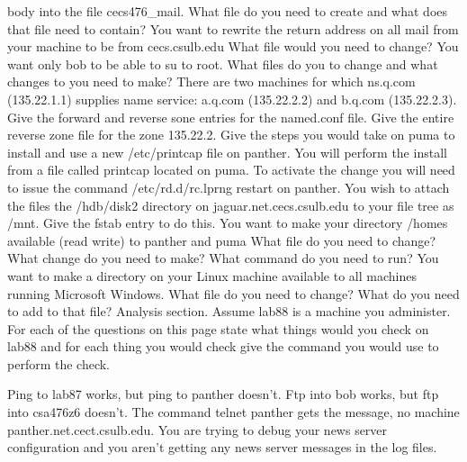 body into the file {\ltt{}cecs476_mail}.
What file do you need to create and what does that file need to contain?
\vskip 1.6in
\vfill\eject
\ques
You want to rewrite the return address on all mail from your machine
to be from {\ltt{}cecs.csulb.edu}
What file would you need to change?
\vskip 0.5in
\ques
You want only {\ltt{}bob} to be able to {\ltt{}su} to {\ltt{}root}.
What files do you to change and what changes to you need to make?
\vskip 1.2in
\ques
There are two machines for which {\ltt{}ns.q.com} ({\ltt{}135.22.1.1})
supplies name service:
{\ltt{}a.q.com} ({\ltt{}135.22.2.2}) and 
{\ltt{}b.q.com} ({\ltt{}135.22.2.3}).
Give the forward and reverse sone entries for the  {\ltt{}named.conf} file.
\vskip 1.5in
\ques
Give the entire reverse zone file for the zone {\ltt{}135.22.2}.
\vskip 3.5in
\vfill\eject
\ques
Give the steps you would take on {\ltt{}puma} to install and use
a new {\ltt{}/etc/printcap} file on {\ltt{}panther}.
You will perform the install from a file called {\ltt{}printcap}
located on {\ltt{}puma}.
To activate the change you will need to issue the command
{\ltt{}/etc/rd.d/rc.lprng restart} on panther.
\vskip 2.4in
\ques
You wish to attach the files the
{\ltt{}/hdb/disk2} directory on {\ltt{}jaguar.net.cecs.csulb.edu}
to your file tree as {\ltt{}/mnt}.
Give the {\ltt{}fstab} entry to do this.
\vskip 0.6in
\ques
You want to make your directory 
{\ltt{}/homes}
available (read write) to {\ltt{}panther} and {\ltt{}puma}
What file do you need to change?
What change do you need to make?
What command do you need to run?
\vskip 1.6in
\ques
You want to make a directory on your
Linux machine available to all machines running Microsoft Windows. 
What file do you need to change?
What do you need to add to that file?
\vskip 1.2in
\vfill\eject
Analysis section. Assume {\ltt{}lab88} is a machine you administer.
For each of the questions on this page
state what things would you check on {\ltt{}lab88}
and for each thing you would check give the command you would use to
perform the check.

\ques
Ping to {\ltt{}lab87} works, but ping to {\ltt{}panther} doesn't.
\vfill
\ques
Ftp into {\ltt{}bob} works, but ftp into {\ltt{}csa476z6} doesn't.
\vfill
\ques
The command {\ltt{}telnet panther} gets the message,
no  machine {\ltt{}panther.net.cect.csulb.edu}.
\vfill
\ques
You are trying to debug your news server configuration
and you aren't getting any news server messages in the log files.
\bye
